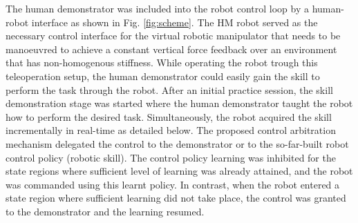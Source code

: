 The human demonstrator was included into the robot control loop by a human-robot interface as shown in Fig. \ref{fig:scheme}. The HM robot served as the necessary control interface for the virtual robotic manipulator that needs to be manoeuvred to achieve a constant vertical force feedback over an environment that has non-homogenous stiffness. While operating the robot trough this teleoperation setup, the human demonstrator could easily gain the skill to perform the task through the robot. After an initial practice session, the skill demonstration stage was started where the human demonstrator taught the robot how to perform the desired task. Simultaneously, the robot acquired the skill incrementally in real-time as detailed below. The proposed control arbitration mechanism delegated the control to the demonstrator or to the so-far-built robot control policy (robotic skill). The control policy learning was inhibited for the state regions where sufficient level of learning was already attained, and the robot was commanded using this learnt policy. In contrast, when the robot entered a state region where sufficient learning did not take place, the control was granted to the demonstrator and the learning resumed.


